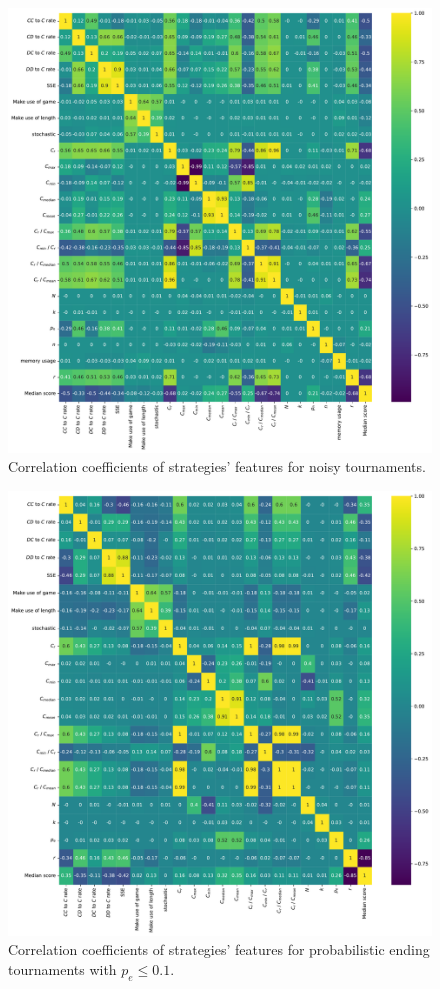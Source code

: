 \begin{figure}[!htbp]
    \begin{center}
        \includegraphics[width=.75\linewidth]{../images/noise_correlation_plot.pdf}
    \end{center}
    \caption{Correlation coefficients of strategies' features for noisy tournaments.}
\end{figure}
\begin{figure}[!htbp]
    \begin{center}
        \includegraphics[width=.75\linewidth]{../images/subset_probend_correlation_plot.pdf}
    \end{center}
    \caption{Correlation coefficients of strategies' features for probabilistic ending tournaments with $p_e \leq 0.1$.}
\end{figure}

